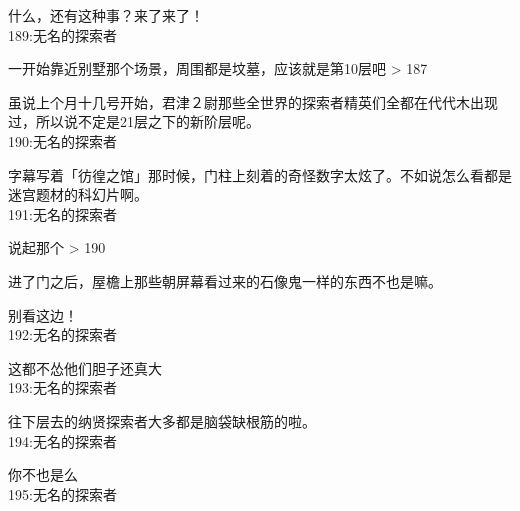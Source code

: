 什么，还有这种事？来了来了！\\

189:无名的探索者

一开始靠近别墅那个场景，周围都是坟墓，应该就是第10层吧 > 187

虽说上个月十几号开始，君津２尉那些全世界的探索者精英们全都在代代木出现过，所以说不定是21层之下的新阶层呢。\\

190:无名的探索者

字幕写着「彷徨之馆」那时候，门柱上刻着的奇怪数字太炫了。不如说怎么看都是迷宫题材的科幻片啊。\\

191:无名的探索者

说起那个 > 190

进了门之后，屋檐上那些朝屏幕看过来的石像鬼一样的东西不也是嘛。

别看这边！\\

192:无名的探索者

这都不怂他们胆子还真大\\

193:无名的探索者

往下层去的纳贤探索者大多都是脑袋缺根筋的啦。\\

194:无名的探索者

你不也是么\\

195:无名的探索者

